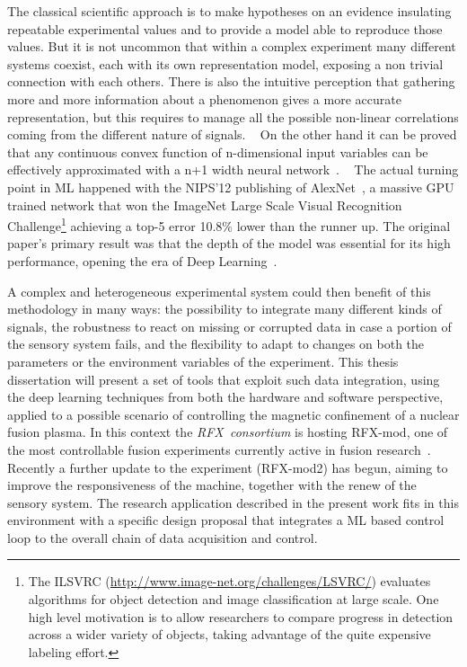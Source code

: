 The classical scientific approach is to make hypotheses on an evidence insulating repeatable experimental values and to provide a model able to reproduce those values. But it is not uncommon that within a complex experiment many different systems coexist, each with its own representation model, exposing a non trivial connection with each others. There is also the intuitive perception that gathering more and more information about a phenomenon gives a more accurate representation, but this requires to manage all the possible non-linear correlations coming from the different nature of signals.
~
On the other hand it can be proved that any continuous convex function of n-dimensional input variables can be effectively approximated with a n+1 width neural network~\cite{csaji2001approximation}\cite{hanin2017universal}.
~
The actual turning point in ML happened with the NIPS'12 publishing of AlexNet~\cite{NIPS2012_4824}, a massive GPU trained network that won the ImageNet Large Scale Visual Recognition Challenge\footnote{The ILSVRC (\url{http://www.image-net.org/challenges/LSVRC/}) evaluates algorithms for object detection and image classification at large scale. One high level motivation is to allow researchers to compare progress in detection across a wider variety of objects, taking advantage of the quite expensive labeling effort.} achieving a top-5 error 10.8\% lower than the runner up. 
The original paper's primary result was that the depth of the model was essential for its high performance, opening the era of Deep Learning~\cite{Goodfellow-et-al-2016}.

A complex and heterogeneous experimental system could then benefit of this methodology in many ways: the possibility to integrate many different kinds of signals, the robustness to react on missing or corrupted data in case a portion of the sensory system fails, and the flexibility to adapt to changes on both the parameters or the environment variables of the experiment.
%
This thesis dissertation will present a set of tools that exploit such data integration, using the deep learning techniques from both the hardware and software perspective, applied to a possible scenario of controlling the magnetic confinement of a nuclear fusion plasma. 
%
%
In this context the \textit{RFX~consortium} is hosting RFX-mod, one of the most controllable fusion experiments currently active in fusion research~\cite{SONATO2003161}\cite{doi:10.1063/1.4806765}.
Recently a further update to the experiment (RFX-mod2) has begun, aiming to improve the responsiveness of the machine, together with the renew of the sensory system. The research application described in the present work fits in this environment with a specific design proposal that integrates a \ac{ML} based control loop to the overall chain of data acquisition and control.

